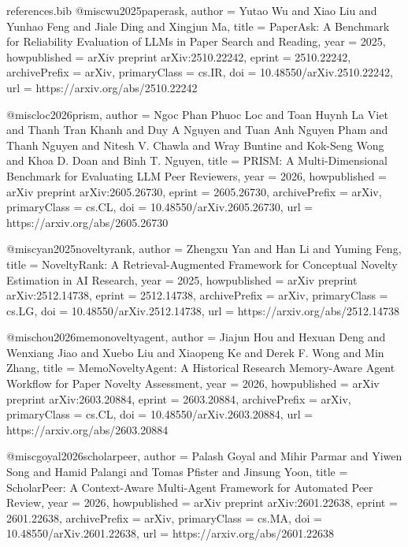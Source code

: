 \begin{filecontents*}{references.bib}
@misc{wu2025paperask,
  author        = {Yutao Wu and Xiao Liu and Yunhao Feng and Jiale Ding and Xingjun Ma},
  title         = {{PaperAsk: A Benchmark for Reliability Evaluation of LLMs in Paper Search and Reading}},
  year          = {2025},
  howpublished  = {arXiv preprint arXiv:2510.22242},
  eprint        = {2510.22242},
  archivePrefix = {arXiv},
  primaryClass  = {cs.IR},
  doi           = {10.48550/arXiv.2510.22242},
  url           = {https://arxiv.org/abs/2510.22242}
}

@misc{loc2026prism,
  author        = {Ngoc Phan Phuoc Loc and Toan Huynh La Viet and Thanh Tran Khanh and Duy A Nguyen and Tuan Anh Nguyen Pham and Thanh Nguyen and Nitesh V. Chawla and Wray Buntine and Kok-Seng Wong and Khoa D. Doan and Binh T. Nguyen},
  title         = {{PRISM: A Multi-Dimensional Benchmark for Evaluating LLM Peer Reviewers}},
  year          = {2026},
  howpublished  = {arXiv preprint arXiv:2605.26730},
  eprint        = {2605.26730},
  archivePrefix = {arXiv},
  primaryClass  = {cs.CL},
  doi           = {10.48550/arXiv.2605.26730},
  url           = {https://arxiv.org/abs/2605.26730}
}

@misc{yan2025noveltyrank,
  author        = {Zhengxu Yan and Han Li and Yuming Feng},
  title         = {{NoveltyRank: A Retrieval-Augmented Framework for Conceptual Novelty Estimation in AI Research}},
  year          = {2025},
  howpublished  = {arXiv preprint arXiv:2512.14738},
  eprint        = {2512.14738},
  archivePrefix = {arXiv},
  primaryClass  = {cs.LG},
  doi           = {10.48550/arXiv.2512.14738},
  url           = {https://arxiv.org/abs/2512.14738}
}

@misc{hou2026memonoveltyagent,
  author        = {Jiajun Hou and Hexuan Deng and Wenxiang Jiao and Xuebo Liu and Xiaopeng Ke and Derek F. Wong and Min Zhang},
  title         = {{MemoNoveltyAgent: A Historical Research Memory-Aware Agent Workflow for Paper Novelty Assessment}},
  year          = {2026},
  howpublished  = {arXiv preprint arXiv:2603.20884},
  eprint        = {2603.20884},
  archivePrefix = {arXiv},
  primaryClass  = {cs.CL},
  doi           = {10.48550/arXiv.2603.20884},
  url           = {https://arxiv.org/abs/2603.20884}
}

@misc{goyal2026scholarpeer,
  author        = {Palash Goyal and Mihir Parmar and Yiwen Song and Hamid Palangi and Tomas Pfister and Jinsung Yoon},
  title         = {{ScholarPeer: A Context-Aware Multi-Agent Framework for Automated Peer Review}},
  year          = {2026},
  howpublished  = {arXiv preprint arXiv:2601.22638},
  eprint        = {2601.22638},
  archivePrefix = {arXiv},
  primaryClass  = {cs.MA},
  doi           = {10.48550/arXiv.2601.22638},
  url           = {https://arxiv.org/abs/2601.22638}
}
\end{filecontents*}

